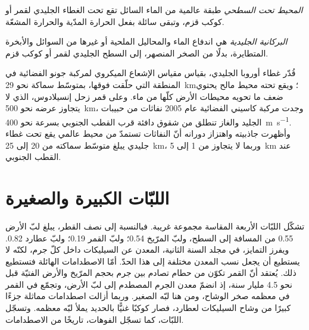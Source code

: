 \begin{definition}\label{def:b3:planetary-interiors-surfaces:ocean-world}
\emph{المحيط تحت السطحي} طبقة عالمية من
الماء السائل تقع تحت الغطاء الجليدي لقمر أو كوكب قزم، وتبقى سائلة بفعل
الحرارة المدّية والحرارة المشعّة.
\end{definition}

\begin{definition}\label{def:b3:planetary-interiors-surfaces:cryovolcanism}
\emph{البركانية الجليدية} هي اندفاع الماء والمحاليل
الملحية أو غيرها من السوائل والأبخرة المتطايرة، بدلًا من الصخر المنصهر، إلى
السطح الجليدي لقمر أو كوكب قزم.
\end{definition}

قُدّر غطاء أوروبا الجليدي، بقياس مقياس الإشعاع الميكروي لمركبة جونو
الفضائية في المنطقة التي حلّقت فوقها، بمتوسّط سماكة نحو \qty{29}{km}؛
ويقع تحته محيط مالح يحتوي ضعف ما تحويه
محيطات الأرض كلّها من ماء. وعلى قمر زحل إنسيلادوس، الذي لا يتجاوز عرضه
نحو \qty{500}{km}، وجدت مركبة كاسيني الفضائية عام 2005 نفاثات من حبيبات الجليد والغاز
تنطلق من شقوق دافئة قرب القطب الجنوبي بسرعة نحو
\qty{400}{m.s^{-1}}. وأظهرت جاذبيته واهتزاز دورانه أنّ
النفاثات تستمدّ من محيط عالمي يقع تحت غطاء جليدي يبلغ متوسّط سماكته من 20 إلى
\qty{25}{km}، وربما لا يتجاوز من 1 إلى \qty{5}{km} عند
القطب الجنوبي.

\section{اللبّات الكبيرة والصغيرة}\label{sec:b3:planetary-interiors-surfaces:cores}

تشكّل اللبّات الأربعة المقاسة مجموعة غريبة. فبالنسبة إلى نصف القطر، يبلغ
لبّ الأرض 0.55 من المسافة إلى السطح، ولبّ المرّيخ 0.54؛ ولبّ القمر
0.19؛ ولبّ عطارد 0.82. ويفرز التمايز، في مجلد السنة الثانية،
المعدن عن السيليكات داخل كلّ جرم، لكنّه لا يستطيع أن يجعل نسب المعدن
مختلفة إلى هذا الحدّ. أمّا الاصطدامات الهائلة فتستطيع ذلك. يُعتقد أنّ القمر تكوّن
من حطام تصادم بين جرم بحجم المرّيخ والأرض
الفتيّة قبل نحو 4.5 مليار سنة، إذ انضمّ معدن الجرم المصطدم
إلى لبّ الأرض، وتجمّع في القمر في معظمه صخر الوشاح، ومن هنا
لبّه الصغير. وربما أزالت اصطدامات مماثلة جزءًا كبيرًا من وشاح السيليكات
لعطارد، فصار كوكبًا غنيًّا بالحديد يملأ لبّه معظمه.
وتسجّل اللبّات، كما تسجّل الفوهات، تاريخًا من الاصطدامات.

